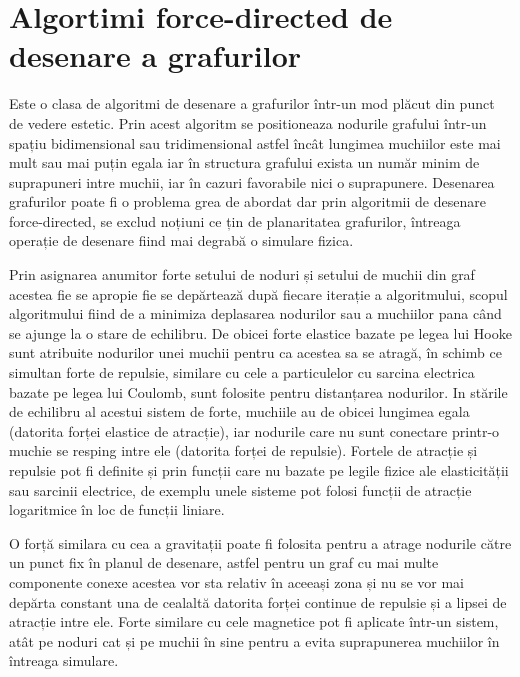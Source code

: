 \newpage
\section{Algortimi force-directed de desenare a grafurilor}

Este o clasa de algoritmi  de desenare a grafurilor într-un mod plăcut din punct de vedere estetic. 
Prin acest algoritm se positioneaza nodurile grafului într-un spațiu bidimensional sau tridimensional astfel încât 
lungimea muchiilor este mai mult sau mai puțin egala iar în structura grafului exista un număr minim de suprapuneri intre muchii, 
iar în cazuri favorabile nici o suprapunere. Desenarea grafurilor poate fi o problema grea de abordat dar prin algoritmii 
de desenare force-directed, se exclud noțiuni ce țin de planaritatea grafurilor, întreaga operație de desenare fiind mai 
degrabă o simulare fizica.\newline

Prin asignarea anumitor forte setului de  noduri și setului de muchii  din graf acestea fie se apropie fie se depărtează după 
fiecare iterație a algoritmului, scopul algoritmului fiind de a minimiza deplasarea nodurilor sau a muchiilor pana când se 
ajunge la o stare de echilibru. De obicei forte elastice bazate pe legea lui Hooke sunt atribuite nodurilor unei muchii 
pentru ca acestea sa se atragă, în schimb ce simultan forte de repulsie, similare cu cele a particulelor cu sarcina electrica 
bazate pe legea lui Coulomb, sunt folosite pentru distanțarea nodurilor. In stările de echilibru al acestui sistem de forte, 
muchiile au de obicei lungimea egala (datorita forței elastice de atracție), iar nodurile care nu sunt conectare printr-o 
muchie se resping intre ele (datorita forței de repulsie). Fortele de atracție și repulsie pot fi definite și prin funcții 
care nu bazate pe legile fizice ale elasticității sau sarcinii electrice, de exemplu unele sisteme pot folosi funcții de 
atracție logaritmice în loc de funcții liniare.\newline

O forță similara cu cea a gravitații poate fi folosita pentru a atrage nodurile către un punct fix în planul de desenare, 
astfel pentru un graf cu mai multe componente conexe acestea vor sta relativ în aceeași zona și nu se vor mai depărta 
constant una de cealaltă datorita forței continue de repulsie și a lipsei de atracție intre ele. Forte similare cu cele 
magnetice pot fi aplicate într-un sistem, atât pe noduri cat și pe muchii în sine pentru a evita suprapunerea muchiilor 
în întreaga simulare.\newline

